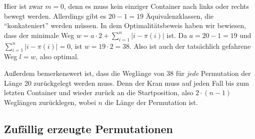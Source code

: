 Hier ist zwar $m = 0$, denn es muss kein einziger Container nach links oder rechts bewegt werden.
Allerdings gibt es $20-1=19$ Äquivalenzklassen, die ``konkateniert'' werden müssen.
In dem Optimalitätsbeweis haben wir bewiesen, dass der minimale Weg $w = a \cdot 2 + \sum_{i = 1}^{n}{\lvert i-\pi(i)\rvert}$ ist.
Da $a=20-1=19$ und $\sum_{i = 1}^{n}{\lvert i-\pi(i)\rvert} = 0$, ist $w = 19 \cdot 2 = 38$. Also ist auch der tatsächlich gefahrene Weg $l = w$, also optimal.

Außerdem bemerkenswert ist, dass die Weglänge von 38 für \emph{jede} Permutation der Länge 20 zurückgelegt werden muss.
Denn der Kran muss auf jeden Fall bis zum letzten Container und wieder zurück an die Startposition, also $2 \cdot (n-1)$ Weglängen zurücklegen, wobei $n$ die Länge der Permutation ist.

\clearpage
\subsection{Zufällig erzeugte Permutationen}
\label{random_perms}
